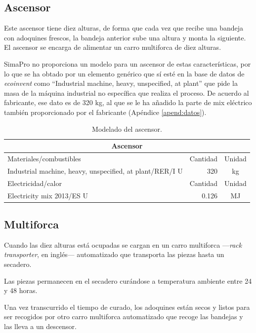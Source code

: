 \subsection{Ascensor}

Este ascensor tiene diez alturas, de forma que cada vez que recibe una bandeja con adoquines frescos, la bandeja anterior sube una altura y monta la siguiente. El ascensor se encarga de alimentar un carro multiforca de diez alturas.

SimaPro no proporciona un modelo para un ascensor de estas características, por lo que se ha obtado por un elemento genérico que sí esté en la base de datos de \textit{ecoinvent} como ``Industrial machine, heavy, unspecified, at plant'' que pide la masa de la máquina industrial no específica que realiza el proceso. De acuerdo al fabricante, ese dato es de 320 \si{kg}, al que se le ha añadido la parte de mix eléctrico también proporcionado por el fabricante (Apéndice \ref{apend:datos}).

\begin{table}[!htb]
\centering
\begin{tabular}{p{8cm}rc}
\toprule
\multicolumn{3}{c}{Ascensor}\\
\midrule
Materiales/combustibles & Cantidad & Unidad\\
\midrule
Industrial machine, heavy, unspecified, at plant/RER/I U & 320 & \si{kg}\\
\midrule
Electricidad/calor & Cantidad & Unidad\\
\midrule
Electricity mix 2013/ES U & 0.126 & \si{MJ}\\
\bottomrule
\end{tabular}
\caption{Modelado del ascensor.}
\label{modeladodelascensor}
\end{table}

\subsection{Multiforca}
Cuando las diez alturas está ocupadas se cargan en un carro multiforca —\textit{rack transporter}, en inglés— automatizado que transporta las piezas hasta un secadero.

Las piezas permanecen en el secadero curándose a temperatura ambiente entre 24 y 48 horas.

Una vez transcurrido el tiempo de curado, los adoquines están secos y listos para ser recogidos por otro carro multiforca automatizado que recoge las bandejas y las lleva a un descensor.

